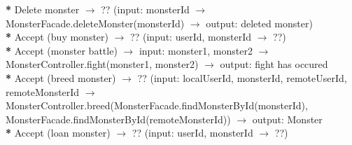 \textbf{*} Delete monster \begin{math}\to\end{math} ?? (input:  monsterId \begin{math}\to\end{math}  MonsterFacade.deleteMonster(monsterId) \begin{math}\to\end{math} output: deleted monster)\\

\textbf{*} Accept (buy monster) \begin{math}\to\end{math} ?? (input:  userId, monsterId \begin{math}\to\end{math} ??)\\

\textbf{*} Accept (monster battle) \begin{math}\to\end{math} input:  monster1, monster2 \begin{math}\to\end{math}  MonsterController.fight(monster1, monster2) \begin{math}\to\end{math} output: fight has occured\\ 

\textbf{*} Accept (breed monster) \begin{math}\to\end{math} ?? (input:  localUserId, monsterId, remoteUserId, remoteMonsterId \begin{math}\to\end{math}  MonsterController.breed(MonsterFacade.findMonsterById(monsterId), MonsterFacade.findMonsterById(remoteMonsterId)) \begin{math}\to\end{math} output:  Monster\\

\textbf{*} Accept (loan monster) \begin{math}\to\end{math} ?? (input:  userId, monsterId \begin{math}\to\end{math} ??)\\

